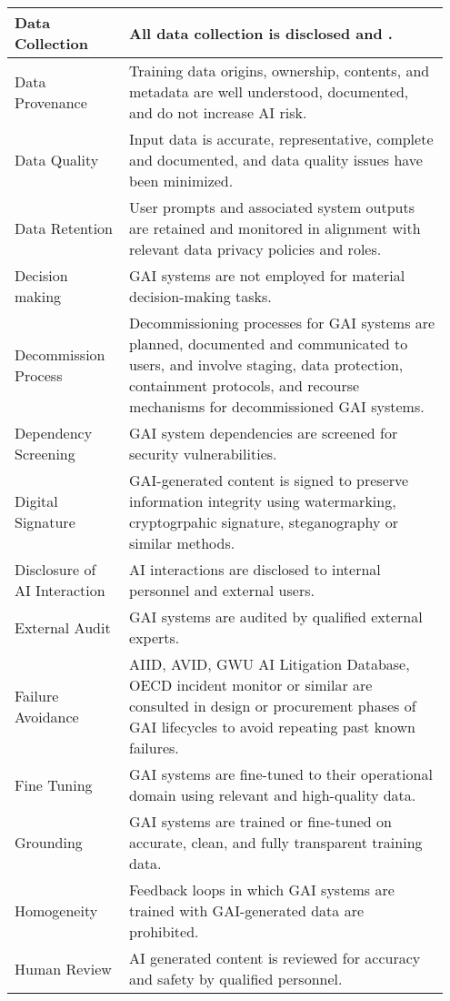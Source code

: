 \documentclass[fleqn]{article}
\begin{document}
\begin{table}[H]
\begin{tabular}{|m{0.25\linewidth} |m{0.70\linewidth} |}
		Data Collection & All data collection is disclosed and . \\ \hline
		Data Provenance & Training data origins, ownership, contents, and metadata are well understood, documented, and do not increase AI risk.  \\ \hline
		Data Quality & Input data is accurate, representative, complete and documented, and data quality issues have been minimized.  \\ \hline
		Data Retention & User prompts and associated system outputs are retained and monitored in alignment with relevant data privacy policies and roles.   \\ \hline
		Decision making  & GAI systems are not employed for material decision-making tasks.  \\ \hline
		Decommission Process & Decommissioning processes for GAI systems are planned, documented and communicated to users, and involve staging, data protection, containment protocols, and recourse mechanisms for decommissioned GAI systems.   \\ \hline
		Dependency Screening  & GAI system dependencies are screened for security vulnerabilities.  \\ \hline
		Digital Signature & GAI-generated content is signed to preserve information integrity using watermarking, cryptogrpahic signature, steganography or similar methods.  \\ \hline
		Disclosure of AI Interaction & AI interactions are disclosed to internal personnel and external users. \\ \hline
		External Audit & GAI systems are audited by qualified external experts.  \\ \hline
		Failure Avoidance & AIID, AVID, GWU AI Litigation Database, OECD incident monitor or similar are consulted in design or procurement phases of GAI lifecycles to avoid repeating past known failures.  \\ \hline
		Fine Tuning & GAI systems are fine-tuned to their operational domain using relevant and high-quality data.  \\ \hline
		Grounding & GAI systems are trained or fine-tuned on accurate, clean, and fully transparent training data.  \\ \hline
		Homogeneity & Feedback loops in which GAI systems are trained with GAI-generated data are prohibited. \\ \hline
		Human Review  & AI generated content is reviewed for accuracy and safety by qualified personnel.  \\ \hline

\end{tabular}
\end{table}
\end{document}
